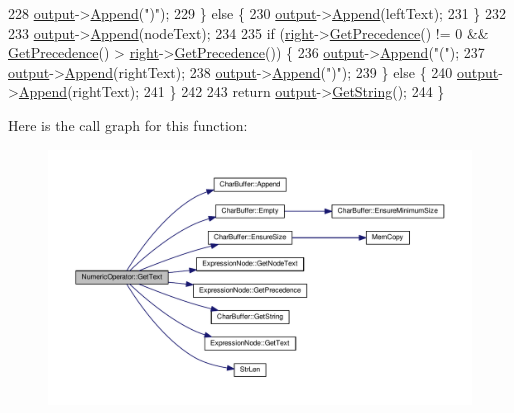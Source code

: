 \begin{DoxyCode}
228         \hyperlink{classSyntaxNode_a1180628cbe3fce43930cee0df5a9ce5c}{output}->\hyperlink{classCharBuffer_a045b38735f7b3007c1b98d3d7b7feafe}{Append}(\textcolor{stringliteral}{")"});
229     \} \textcolor{keywordflow}{else} \{
230         \hyperlink{classSyntaxNode_a1180628cbe3fce43930cee0df5a9ce5c}{output}->\hyperlink{classCharBuffer_a045b38735f7b3007c1b98d3d7b7feafe}{Append}(leftText);
231     \}
232 
233     \hyperlink{classSyntaxNode_a1180628cbe3fce43930cee0df5a9ce5c}{output}->\hyperlink{classCharBuffer_a045b38735f7b3007c1b98d3d7b7feafe}{Append}(nodeText);
234 
235     \textcolor{keywordflow}{if} (\hyperlink{classNumericOperator_aa2c5b5bea59bbb068bc6013bc5cac483}{right}->\hyperlink{classExpressionNode_a161b9ea0b79bbfc101d6f687c8481ddd}{GetPrecedence}() != 0 && \hyperlink{classExpressionNode_a161b9ea0b79bbfc101d6f687c8481ddd}{GetPrecedence}() > 
      \hyperlink{classNumericOperator_aa2c5b5bea59bbb068bc6013bc5cac483}{right}->\hyperlink{classExpressionNode_a161b9ea0b79bbfc101d6f687c8481ddd}{GetPrecedence}()) \{
236         \hyperlink{classSyntaxNode_a1180628cbe3fce43930cee0df5a9ce5c}{output}->\hyperlink{classCharBuffer_a045b38735f7b3007c1b98d3d7b7feafe}{Append}(\textcolor{stringliteral}{"("});
237         \hyperlink{classSyntaxNode_a1180628cbe3fce43930cee0df5a9ce5c}{output}->\hyperlink{classCharBuffer_a045b38735f7b3007c1b98d3d7b7feafe}{Append}(rightText);
238         \hyperlink{classSyntaxNode_a1180628cbe3fce43930cee0df5a9ce5c}{output}->\hyperlink{classCharBuffer_a045b38735f7b3007c1b98d3d7b7feafe}{Append}(\textcolor{stringliteral}{")"});
239     \} \textcolor{keywordflow}{else} \{
240         \hyperlink{classSyntaxNode_a1180628cbe3fce43930cee0df5a9ce5c}{output}->\hyperlink{classCharBuffer_a045b38735f7b3007c1b98d3d7b7feafe}{Append}(rightText);
241     \}
242 
243     \textcolor{keywordflow}{return} \hyperlink{classSyntaxNode_a1180628cbe3fce43930cee0df5a9ce5c}{output}->\hyperlink{classCharBuffer_a7dfd3feaaf80f318ba44efe15b1ec44b}{GetString}();
244 \}
\end{DoxyCode}


Here is the call graph for this function\+:\nopagebreak
\begin{figure}[H]
\begin{center}
\leavevmode
\includegraphics[width=350pt]{classNumericOperator_aaeef2885eb34d240cef0f55593354805_cgraph}
\end{center}
\end{figure}


